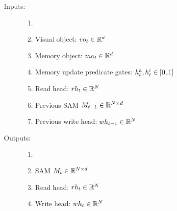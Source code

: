 
%
%
%	
%
%

\begin{description}
	\item[Inputs:] 
	\begin{enumerate}
		\item[]
		\item Visual object: $vo_t \in \mathbb{R}^d$
		\item Memory object: $mo_t \in \mathbb{R}^d$
		\item Memory update predicate gates:  $h^{\mathrm{a}}_t, h^{\mathrm{r}}_t \in [0,1]$
		\item Read head: $rh_t \in \mathbb{R}^N$
		\item Previous SAM $M_{t-1} \in \mathbb{R}^{N \times d}$
		\item Previous write head: $wh_{t-1} \in \mathbb{R}^N$
	\end{enumerate}
	
	\item[Outputs:] 
	\begin{enumerate}
		\item[]
		\item SAM $M_t \in \mathbb{R}^{N \times d}$
		\item Read head: $rh_t \in \mathbb{R}^N$
		\item Write head: $wh_t \in \mathbb{R}^N$
	\end{enumerate}
	
\end{description}



